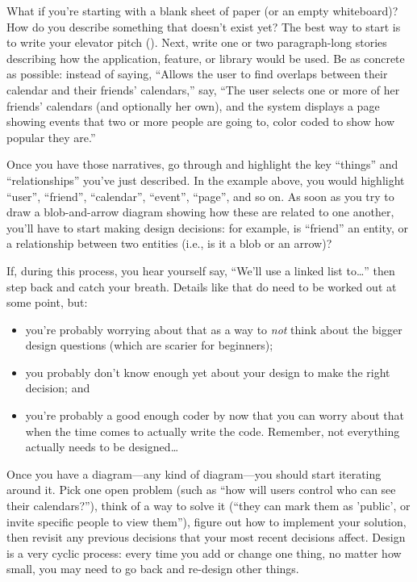 \documentclass{report}
\begin{document}
What if you're starting with a blank sheet of paper (or an empty
whiteboard)?  How do you describe something that doesn't exist yet?
The best way to start is to write your elevator pitch
().  Next, write one or two paragraph-long
stories describing how the application, feature, or library would be
used.  Be as concrete as possible: instead of saying, ``Allows the
user to find overlaps between their calendar and their friends'
calendars,'' say, ``The user selects one or more of her friends'
calendars (and optionally her own), and the system displays a page
showing events that two or more people are going to, color coded to
show how popular they are.''

Once you have those narratives, go through and highlight the key
``things'' and ``relationships'' you've just described.  In the
example above, you would highlight ``user'', ``friend'', ``calendar'',
``event'', ``page'', and so on.  As soon as you try to draw a
blob-and-arrow diagram showing how these are related to one another,
you'll have to start making design decisions: for example, is
``friend'' an entity, or a relationship between two entities (i.e., is
it a blob or an arrow)?

If, during this process, you hear yourself say, ``We'll use a linked
list to{\ldots}'' then step back and catch your breath.  Details like
that do need to be worked out at some point, but:

\begin{itemize}

  \item you're probably worrying about that as a way to \emph{not}
  think about the bigger design questions (which are scarier for
  beginners);

  \item you probably don't know enough yet about your design to make
  the right decision; and

  \item you're probably a good enough coder by now that you can worry
  about that when the time comes to actually write the code.
  Remember, not everything actually needs to be designed{\ldots}

\end{itemize}

Once you have a diagram---any kind of diagram---you should start
iterating around it.  Pick one open problem (such as ``how will users
control who can see their calendars?''), think of a way to solve it
(``they can mark them as 'public', or invite specific people to view
them''), figure out how to implement your solution, then revisit any
previous decisions that your most recent decisions affect.  Design is
a very cyclic process: every time you add or change one thing, no
matter how small, you may need to go back and re-design other things.
\end{document}
